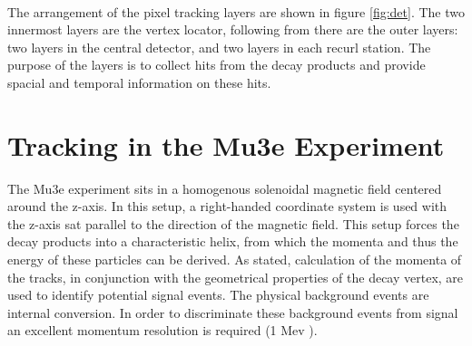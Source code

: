 \paragraph{}
The arrangement of the pixel tracking layers are shown in figure \ref{fig:det}. 
The two innermost layers are the vertex locator, following from there are the outer layers: two layers in the central detector, and two layers in each recurl station. 
The purpose of the layers is to collect hits from the decay products and provide spacial and temporal information on these hits.

\section*{Tracking in the Mu3e Experiment}
The Mu3e experiment sits in a homogenous solenoidal magnetic field centered around the z-axis. In this setup, a right-handed coordinate system is used with the z-axis sat parallel to the direction of the magnetic field. 
This setup forces the decay products into a characteristic helix, from which the momenta and thus the energy of these particles can be derived.
As stated, calculation of the momenta of the tracks, in conjunction with the geometrical properties of the decay vertex, are used to identify potential signal events.
The physical background events are internal conversion. In order to discriminate these background events from signal an excellent momentum resolution is required (1 Mev \cite{MartinPerez2023}).
